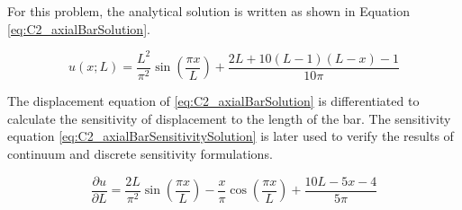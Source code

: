 For this problem, the analytical solution is written as shown in Equation \eqref{eq:C2_axialBarSolution}.

\begin{equation}\label{eq:C2_axialBarSolution}
    u(x; L) = 
    \frac{L^2}{\pi^2} \sin \left( \frac{\pi x}{L} \right) + 
    \frac{2L + 10(L - 1)(L - x) - 1}{10 \pi}
\end{equation}

The displacement equation of \eqref{eq:C2_axialBarSolution} is differentiated to calculate the sensitivity of displacement to the length of the bar. The sensitivity equation \eqref{eq:C2_axialBarSensitivitySolution} is later used to verify the results of continuum and discrete sensitivity formulations.

\begin{equation}\label{eq:C2_axialBarSensitivitySolution}
    \dfrac{\partial u}{\partial L} = 
    \dfrac{2L}{\pi^2} \sin \left( \frac{\pi x}{L} \right) - 
    \dfrac{x}{\pi} \cos \left( \frac{\pi x}{L} \right) + 
    \dfrac{10L - 5x - 4}{5 \pi}
\end{equation}



